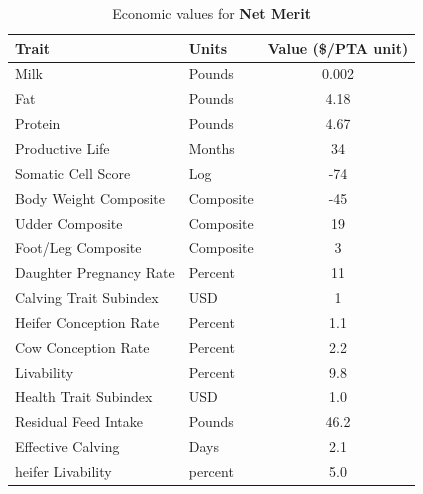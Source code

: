 
\begin{table}[H]
    \centering
    \begin{tabular}{llc}
    \hline
        Trait & Units & Value (\$/PTA unit)\\
        \hline
        Milk & Pounds & 0.002\\
        Fat & Pounds & 4.18\\
        Protein & Pounds & 4.67\\
        Productive Life & Months & 34\\
        Somatic Cell Score & Log & -74\\
        Body Weight Composite & Composite & -45\\
        Udder Composite & Composite & 19 \\
        Foot/Leg Composite & Composite & 3 \\
        Daughter Pregnancy Rate & Percent & 11\\
        Calving Trait Subindex & USD & 1\\
        Heifer Conception Rate & Percent & 1.1\\
        Cow Conception Rate & Percent & 2.2\\
        Livability & Percent & 9.8\\
        Health Trait Subindex & USD & 1.0\\
        Residual Feed Intake & Pounds & 46.2\\
        Effective Calving & Days & 2.1\\
        heifer Livability & percent & 5.0\\
        \hline
    \end{tabular}
    \caption{Economic values for \textbf{Net Merit}}
    \label{tab:net_merit}
\end{table}